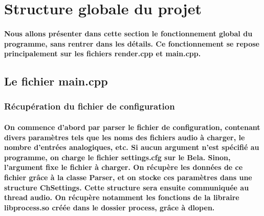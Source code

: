 \documentclass[a4paper]{article}
\begin{document}
\section{Structure globale du projet} \paragraph{Nous allons présenter dans
cette section le fonctionnement global du programme, sans rentrer dans les
détails. Ce fonctionnement se repose principalement sur les fichiers render.cpp
et main.cpp.}

\subsection{Le fichier main.cpp} \subsubsection{Récupération du fichier de
configuration} \paragraph{On commence d’abord par parser le fichier de
configuration, contenant divers paramètres tels que les noms des fichiers audio à
charger, le nombre d’entrées analogiques, etc. Si aucun argument n’est spécifié
au programme, on charge le fichier settings.cfg sur le Bela. Sinon, l’argument
fixe le fichier à charger. On récupère les données de ce fichier grâce à la
classe Parser, et on stocke ces paramètres dans une structure ChSettings. Cette
structure sera ensuite communiquée au thread audio. On récupère notamment les
fonctions de la libraire libprocess.so créée dans le dossier process, grâce à
dlopen.}
\end{document}
